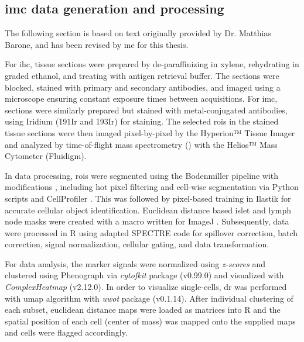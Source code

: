 \subsection[\glsentryshort{imc} data generation and processing]{\large \gls{imc} data generation and processing}
\label{subsec:met_chp2_imcdata}
\vspace{3mm}
\begin{Comment2}
\vspace{1mm}
\hspace{-3mm}
The following section is based on text originally provided by Dr. Matthias Barone, and has been revised by me for this thesis.
\vspace{1mm}
\end{Comment2}
\vspace{3mm}

For \gls{ihc}, tissue sections were prepared by de-paraffinizing in xylene, rehydrating in graded ethanol, and treating with antigen retrieval buffer. The sections were blocked, stained with primary and secondary antibodies, and imaged using a microscope ensuring constant exposure times between acquisitions. For \gls{imc}, sections were similarly prepared but stained with metal-conjugated antibodies, using Iridium (191Ir and 193Ir) for  staining. The selected \glspl{roi} in the stained tissue sections were then imaged pixel-by-pixel by the Hyperion™ Tissue Imager and analyzed by time-of-flight mass spectrometry () with the Helios™ Mass Cytometer (Fluidigm).\\

\par In data processing, \glspl{roi} were segmented using the Bodenmiller pipeline with modifications \textbf{\cite{eling_imc_2022}}, including hot pixel filtering and cell-wise segmentation via Python scripts and CellProfiler \textbf{\cite{carpenter_cellprofiler_2006,mcquin_cellprofiler_2018}}. This was followed by pixel-based training in Ilastik \textbf{\cite{berg_ilastik_2019}} for accurate cellular object identification. Euclidean distance based islet and lymph node masks were created with a macro written for ImageJ \textbf{\cite{schneider_nih_2012}}. Subsequently, data were processed in R using adapted SPECTRE \textbf{\cite{ashhurst_integration_2022}} code for spillover correction, batch correction, signal normalization, cellular gating, and data transformation.\\

\par For data analysis, the marker signals were normalized using \textit{z-scores} and clustered using Phenograph via \textit{cytofkit} package (v0.99.0) and visualized with \textit{ComplexHeatmap} (v2.12.0). In order to visualize single-cells, \gls{dr} was performed with \gls{umap} algorithm with \textit{uwot} package (v0.1.14). After individual clustering of each subset, euclidean distance maps were loaded as matrices into R and the spatial position of each cell (center of mass) was mapped onto the supplied maps and cells were flagged accordingly.


